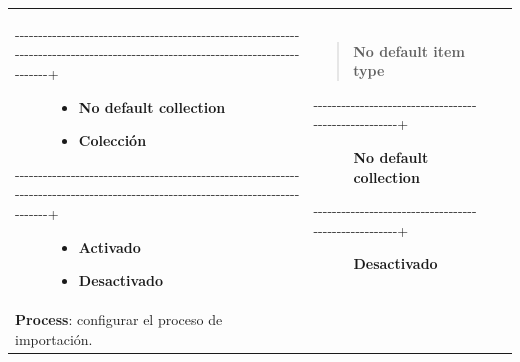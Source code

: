 \documentclass[
]{article}
\providecommand{\tightlist}{%
  \setlength{\itemsep}{0pt}\setlength{\parskip}{0pt}}
\begin{document}
\begin{longtable}[]{@{}llll@{}}
\begin{minipage}[t]{0.22\columnwidth}
\begin{description}
\item[-\/-\/-\/-\/-\/-\/-\/-\/-\/-\/-\/-\/-\/-\/-\/-\/-\/-\/-\/-\/-\/-\/-\/-\/-\/-\/-\/-\/-\/-\/-\/-\/-\/-\/-\/-\/-\/-\/-\/-\/-\/-\/-\/-\/-\/-\/-\/-\/-\/-\/-\/-\/-\/-\/-\/-\/-\/-\/-\/-\/-\/-\/-\/-\/-\/-\/-\/-\/-\/-\/-\/-\/-\/-\/-\/-\/-\/-\/-\/-\/-\/-\/-\/-\/-\/-\/-\/-\/-\/-\/-\/-\/-\/-\/-\/-\/-\/-\/-\/-\/-\/-\/-\/-\/-\/-\/-\/-\/-\/-\/-\/-\/-\/-\/-\/-\/-\/-\/-\/-\/-\/-\/-\/-\/-\/-\/-\/-\/-+]
\begin{itemize}
\tightlist
\item
  \textbf{No default collection}
\item
  \textbf{Colección}
\end{itemize}
\item[-\/-\/-\/-\/-\/-\/-\/-\/-\/-\/-\/-\/-\/-\/-\/-\/-\/-\/-\/-\/-\/-\/-\/-\/-\/-\/-\/-\/-\/-\/-\/-\/-\/-\/-\/-\/-\/-\/-\/-\/-\/-\/-\/-\/-\/-\/-\/-\/-\/-\/-\/-\/-\/-\/-\/-\/-\/-\/-\/-\/-\/-\/-\/-\/-\/-\/-\/-\/-\/-\/-\/-\/-\/-\/-\/-\/-\/-\/-\/-\/-\/-\/-\/-\/-\/-\/-\/-\/-\/-\/-\/-\/-\/-\/-\/-\/-\/-\/-\/-\/-\/-\/-\/-\/-\/-\/-\/-\/-\/-\/-\/-\/-\/-\/-\/-\/-\/-\/-\/-\/-\/-\/-\/-\/-\/-\/-\/-\/-+]
\begin{itemize}
\tightlist
\item
  \textbf{Activado}
\item
  \textbf{Desactivado}
\end{itemize}
\end{description}\strut
\end{minipage} & \begin{minipage}[t]{0.22\columnwidth}\raggedright
\begin{quote}
\textbf{No default item type}
\end{quote}

\begin{description}
\item[-\/-\/-\/-\/-\/-\/-\/-\/-\/-\/-\/-\/-\/-\/-\/-\/-\/-\/-\/-\/-\/-\/-\/-\/-\/-\/-\/-\/-\/-\/-\/-\/-\/-\/-\/-\/-\/-\/-\/-\/-\/-\/-\/-\/-\/-\/-\/-\/-\/-\/-\/-\/-+]
\textbf{No default collection}
\item[-\/-\/-\/-\/-\/-\/-\/-\/-\/-\/-\/-\/-\/-\/-\/-\/-\/-\/-\/-\/-\/-\/-\/-\/-\/-\/-\/-\/-\/-\/-\/-\/-\/-\/-\/-\/-\/-\/-\/-\/-\/-\/-\/-\/-\/-\/-\/-\/-\/-\/-\/-\/-+]
\textbf{Desactivado}
\end{description}\strut
\end{minipage}\tabularnewline
\begin{minipage}[t]{0.22\columnwidth}\raggedright
\textbf{Process}: configurar el proceso de importación.


\end{minipage}
\end{longtable}
\end{document}
